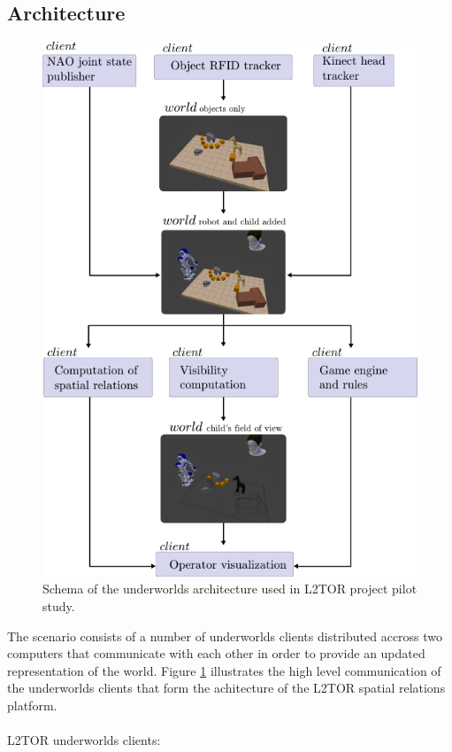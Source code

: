 \documentclass[letterpaper, 10 pt, conference]{ieeeconf}  %
\newcommand{\uwds}{{\sc underworlds}\xspace}
\begin{document}
\subsection*{Architecture}
\begin{figure}
    \centering
    \includegraphics[width=\linewidth]{l2tor}
    \caption{Schema of the \uwds architecture used in L2TOR project pilot study. }
    \label{fig|l2torarchitecture}
\end{figure}

The scenario consists of a number of \uwds clients distributed accross two computers that communicate with each other in order to provide an updated representation of the world. Figure \ref{fig|l2torarchitecture} illustrates the high level communication of the \uwds clients that form the achitecture of the L2TOR spatial relations platform.\\
\\L2TOR \uwds clients:
\end{document}

